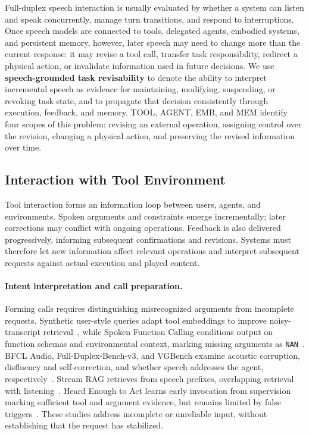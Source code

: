 Full-duplex speech interaction is usually evaluated by whether a system can listen and speak concurrently, manage turn transitions, and respond to interruptions. Once speech models are connected to tools, delegated agents, embodied systems, and persistent memory, however, later speech may need to change more than the current response: it may revise a tool call, transfer task responsibility, redirect a physical action, or invalidate information used in future decisions. We use \textbf{speech-grounded task revisability} to denote the ability to interpret incremental speech as evidence for maintaining, modifying, suspending, or revoking task state, and to propagate that decision consistently through execution, feedback, and memory. TOOL, AGENT, EMB, and MEM identify four scopes of this problem: revising an external operation, assigning control over the revision, changing a physical action, and preserving the revised information over time.

\subsection{Interaction with Tool Environment}
\label{sec:interaction-with-tool-environment}
Tool interaction forms an information loop between users, agents, and environments. Spoken arguments and constraints emerge incrementally; later corrections may conflict with ongoing operations. Feedback is also delivered progressively, informing subsequent confirmations and revisions. Systems must therefore let new information affect relevant operations and interpret subsequent requests against actual execution and played content.

\paragraph{Intent interpretation and call preparation.}
Forming calls requires distinguishing misrecognized arguments from incomplete requests. Synthetic user-style queries adapt tool embeddings to improve noisy-transcript retrieval~\citep{WEB:isca/zorila26_interspeech}, while Spoken Function Calling conditions output on function schemas and environmental context, marking missing arguments as \texttt{NAN}~\citep{DBLP:journals/corr/abs-2608-05126}. BFCL Audio, Full-Duplex-Bench-v3, and VGBench examine acoustic corruption, disfluency and self-correction, and whether speech addresses the agent, respectively~\citep{WEB:pmlr/v306/mao26b,DBLP:journals/corr/abs-2604-04847,DBLP:journals/corr/abs-2609-32536}. Stream RAG retrieves from speech prefixes, overlapping retrieval with listening~\citep{DBLP:journals/corr/abs-2510-02044}. Heard Enough to Act learns early invocation from supervision marking sufficient tool and argument evidence, but remains limited by false triggers~\citep{WEB:arxiv/2610.34653}. These studies address incomplete or unreliable input, without establishing that the request has stabilized.

